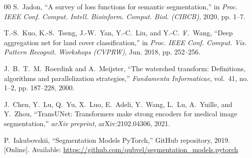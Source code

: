 \documentclass[conference,letterpaper,10pt]{IEEEtran}
\begin{document}
\begin{thebibliography}{00}
S.~Jadon, ``A survey of loss functions for semantic segmentation,''
in \emph{Proc. IEEE Conf. Comput. Intell. Bioinform. Comput. Biol.
(CIBCB)}, 2020, pp. 1--7.

T.-S.~Kuo, K.-S.~Tseng, J.-W.~Yan, Y.-C.~Liu, and Y.-C.~F.~Wang,
``Deep aggregation net for land cover classification,'' in
\emph{Proc. IEEE Conf. Comput. Vis. Pattern Recognit. Workshops (CVPRW)},
Jun. 2018, pp. 252--256.

J.~B.~T.~M.~Roerdink and A.~Meijster, ``The watershed transform:
Definitions, algorithms and parallelization strategies,''
\emph{Fundamenta Informaticae}, vol.~41, no. 1--2, pp. 187--228, 2000.

J.~Chen, Y.~Lu, Q.~Yu, X.~Luo, E.~Adeli, Y.~Wang, L.~Lu, A.~Yuille, and
Y.~Zhou, ``TransUNet: Transformers make strong encoders for medical image
segmentation,'' \emph{arXiv preprint}, arXiv:2102.04306, 2021.

P.~Iakubovskii, ``Segmentation Models PyTorch,'' GitHub repository, 2019.
[Online]. Available: \url{https://github.com/qubvel/segmentation_models.pytorch}

\end{thebibliography}
\end{document}
